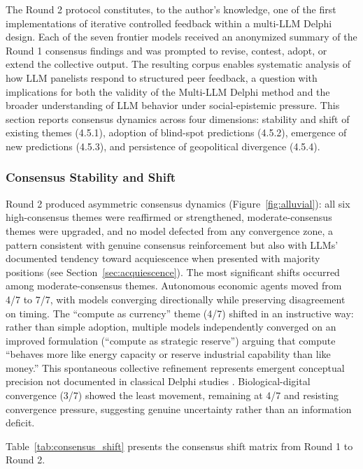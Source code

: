 \documentclass[preprint,review,12pt]{elsarticle}
\begin{document}
The Round 2 protocol constitutes, to the author's knowledge, one of the first implementations of iterative controlled feedback within a multi-LLM Delphi design. Each of the seven frontier models received an anonymized summary of the Round 1 consensus findings and was prompted to revise, contest, adopt, or extend the collective output. The resulting corpus enables systematic analysis of how LLM panelists respond to structured peer feedback, a question with implications for both the validity of the Multi-LLM Delphi method and the broader understanding of LLM behavior under social-epistemic pressure. This section reports consensus dynamics across four dimensions: stability and shift of existing themes (4.5.1), adoption of blind-spot predictions (4.5.2), emergence of new predictions (4.5.3), and persistence of geopolitical divergence (4.5.4).

\subsubsection{Consensus Stability and Shift}
\label{sec:consensus_stability}

Round 2 produced asymmetric consensus dynamics (Figure~\ref{fig:alluvial}): all six high-consensus themes were reaffirmed or strengthened, moderate-consensus themes were upgraded, and no model defected from any convergence zone, a pattern consistent with genuine consensus reinforcement but also with LLMs' documented tendency toward acquiescence when presented with majority positions (see Section~\ref{sec:acquiescence}). The most significant shifts occurred among moderate-consensus themes. Autonomous economic agents moved from 4/7 to 7/7, with models converging directionally while preserving disagreement on timing. The ``compute as currency'' theme (4/7) shifted in an instructive way: rather than simple adoption, multiple models independently converged on an improved formulation (``compute as strategic reserve'') arguing that compute ``behaves more like energy capacity or reserve industrial capability than like money.'' This spontaneous collective refinement represents emergent conceptual precision not documented in classical Delphi studies \citep{vondergracht2012delphi}. Biological-digital convergence (3/7) showed the least movement, remaining at 4/7 and resisting convergence pressure, suggesting genuine uncertainty rather than an information deficit.

Table~\ref{tab:consensus_shift} presents the consensus shift matrix from Round 1 to Round 2.
\end{document}
